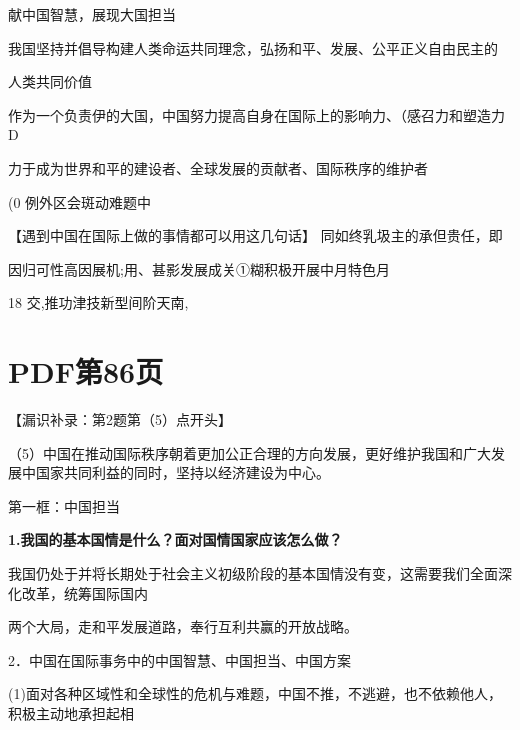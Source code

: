 \documentclass[lang=cn,11pt]{elegantbook}
\newcommand{\daofasym}[1]{{\daofasymbolfont #1}}
\newcommand{\daofasym}[1]{#1}
\begin{document}
献中国智慧，展现大国担当\par

我国坚持并倡导构建人类命运共同理念，弘扬和平、发展、公平正义自由民主的\par

人类共同价值\par

作为一个负责伊的大国，中国努力提高自身在国际上的影响力、（感召力和塑造力D\par

力于成为世界和平的建设者、全球发展的贡献者、国际秩序的维护者\par

(0 例外区会斑动难题中\par

【遇到中国在国际上做的事情都可以用这几句话】 同如终乳圾主的承但贵任，即\par

因归可性高因展机;用、甚影发展成关\daofasym{①}糊积极开展中月特色月\par

18 交,推功津技新型间阶天南,\par


\section*{PDF第86页}

【漏识补录：第2题第（5）点开头】\par

（5）中国在推动国际秩序朝着更加公正合理的方向发展，更好维护我国和广大发展中国家共同利益的同时，坚持以经济建设为中心。\par

第一框：中国担当\par

\textbf{1.我国的基本国情是什么？面对国情国家应该怎么做？}\par

我国仍处于并将长期处于社会主义初级阶段的基本国情没有变，这需要我们全面深化改革，统筹国际国内\par

两个大局，走和平发展道路，奉行互利共赢的开放战略。\par

2．中国在国际事务中的中国智慧、中国担当、中国方案\par

(1)面对各种区域性和全球性的危机与难题，中国不推，不逃避，也不依赖他人，积极主动地承担起相\par
\end{document}
